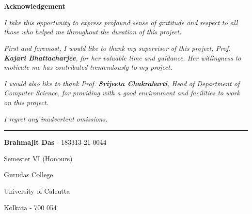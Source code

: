 \section*{}%

\begin{center}
	{
		\Huge
		\textbf{Acknowledgement}
	}
\end{center}


\vspace{3cm}

\onehalfspacing

\textit{
	I take this opportunity to express profound sense of gratitude and respect to
	all those who helped me throughout the duration of this project.
}

\vspace{1cm}

\textit{
	First and foremost, I would like to thank my supervisor of this project, Prof.
	\textbf{Kajari Bhattacharjee}, for her valuable time and guidance. Her
	willingness to motivate me has contributed tremendously to my project.
}

\vspace{1cm}

\textit{
	I would also like to thank Prof. \textbf{Srijeeta Chakrabarti}, Head of
	Department of Computer Science, for providing with a good environment and
	facilities to work on this project.
}

\vspace{1cm}

\textit{
	I regret any inadvertent omissions.
}

\vfill

\rule{7cm}{0.4pt}

\textbf{Brahmajit Das} - 183313-21-0044

Semester VI (Honours)

Gurudas College

University of Calcutta

Kolkata - 700 054

\singlespacing
